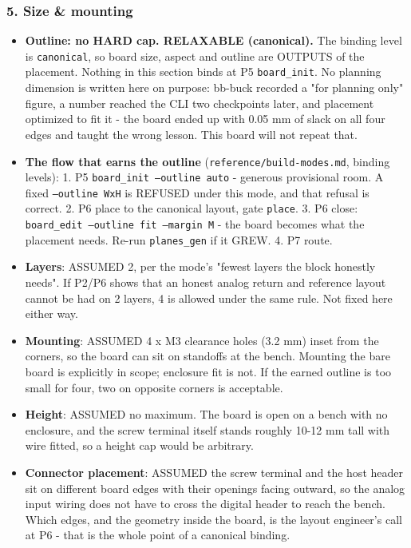 \documentclass[11pt,a4paper]{article}
\begin{document}
\subsubsection*{5. Size \& mounting}
\begin{itemize}
\item \textbf{Outline: no HARD cap. RELAXABLE (canonical).} The binding level is
\texttt{canonical}, so board size, aspect and outline are OUTPUTS of the placement.
Nothing in this section binds at P5 \texttt{board\_init}. No planning dimension is
written here on purpose: bb-buck recorded a "for planning only" figure, a
number reached the CLI two checkpoints later, and placement optimized to fit
it - the board ended up with 0.05 mm of slack on all four edges and taught
the wrong lesson. This board will not repeat that.
\item \textbf{The flow that earns the outline} (\texttt{reference/build-modes.md}, binding
levels):
1. P5 \texttt{board\_init --outline auto} - generous provisional room. A fixed
\texttt{--outline WxH} is REFUSED under this mode, and that refusal is correct.
2. P6 place to the canonical layout, gate \texttt{place}.
3. P6 close: \texttt{board\_edit --outline fit --margin M} - the board becomes what
the placement needs. Re-run \texttt{planes\_gen} if it GREW.
4. P7 route.
\item \textbf{Layers}: ASSUMED 2, per the mode's "fewest layers the block honestly
needs". If P2/P6 shows that an honest analog return and reference layout
cannot be had on 2 layers, 4 is allowed under the same rule. Not fixed here
either way.
\item \textbf{Mounting}: ASSUMED 4 x M3 clearance holes (3.2 mm) inset from the
corners, so the board can sit on standoffs at the bench. Mounting the bare
board is explicitly in scope; enclosure fit is not. If the earned outline is
too small for four, two on opposite corners is acceptable.
\item \textbf{Height}: ASSUMED no maximum. The board is open on a bench with no
enclosure, and the screw terminal itself stands roughly 10-12 mm tall with
wire fitted, so a height cap would be arbitrary.
\item \textbf{Connector placement}: ASSUMED the screw terminal and the host header sit
on different board edges with their openings facing outward, so the analog
input wiring does not have to cross the digital header to reach the bench.
Which edges, and the geometry inside the board, is the layout engineer's
call at P6 - that is the whole point of a canonical binding.
\end{itemize}
\end{document}
